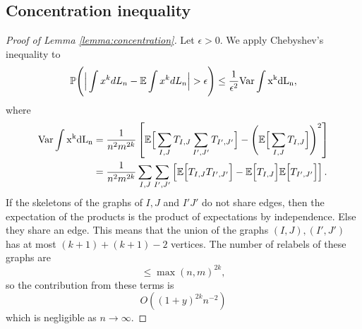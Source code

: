 \subsection*{Concentration inequality}
\begin{proof}[Proof of Lemma \ref{lemma:concentration}]
    Let $\epsilon>0$. We apply Chebyshev's inequality to \begin{align*}
        \mathbb{P}\Bigg(\Big|\int x^k dL_n - \mathbb{E}\int x^k dL_n\Big|>\epsilon\Bigg)\leq \frac{1}{\epsilon^2} \rm{Var}\int x^k dL_n ,
    \end{align*}
    where \begin{align*}
        \rm{Var}\int x^k dL_n &= \frac{1}{n^2m^{2k}}\left[\mathbb{E}\Big[\sum_{I,J} T_{I,J}\sum_{I',J'} T_{I',J'}\Big]-\Bigg(\mathbb{E}\Big[\sum_{I,J} T_{I,J}\Big]\Bigg)^2\right]\\
        & = \frac{1}{n^2m^{2k}}\sum_{I,J}\sum_{I',J'}\left[\mathbb{E}\Big[ T_{I,J} T_{I',J'}\Big]-\mathbb{E}\Big[ T_{I,J}\Big]\mathbb{E}\Big[ T_{I',J'}\Big]\right].
    \end{align*}
    If the skeletons of the graphs of $I,J$ and $I'J'$ do not share edges, then the expectation of the products is the product of expectations by independence. Else
    they share an edge. This means that the union of the graphs $(I,J),(I',J')$ has at most $(k+1)+(k+1)-2$ vertices. The number of relabels of these graphs are \[
    \leq \max(n,m)^{2k}, 
    \] 
    so the contribution from these terms is \[
    O((1+y)^{2k} n^{-2})
    \]
    which is negligible as $n\to \infty$.
\end{proof}